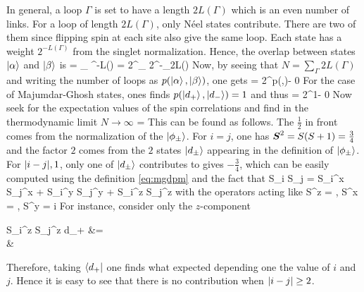 		In general, a loop $\Gamma$ is set to have a length $2L(\Gamma)$ which is an even number of links. For a loop of length $2L(\Gamma)$, only Néel states contribute. There are two of them since flipping spin at each site also give the same loop. Each state has a weight $2^{-L(\Gamma)}$ from the singlet normalization. Hence, the overlap between states $\ket \alpha$ and $\ket \beta$ is
		\be \braket{\alpha}{\beta} = \prod_ ^{-L(\Gamma)} = 2^{\sum_} 2^{-\sum_\Gamma 2L(\Gamma)} \ee
		Now, by seeing that $N = \sum_\Gamma 2L(\Gamma)$ and writing the number of loops as $p(\ket \alpha,\ket \beta)$, one gets
		\be \braket{\alpha}{\beta} = 2^{p(\ket \alpha,\ket \beta)-}  0 \ee
		For the case of Majumdar-Ghosh states, ones finds $p(\ket{d_+}, \ket{d_-}) = 1$ and thus
		\be {} = 2^{1-}  0 \ee
		Now seek for the expectation values of the spin correlations and find in the thermodynamic limit $N\to \infty$
		\be {} =   \ee
		This can be found as follows. The $\frac{1}{2}$ in front comes from the normalization of the $\ket{\phi_\pm}$. For $i=j$, one has $\vb* S^2 = S(S+1) = \frac{3}{4}$ and the factor $2$ comes from the $2$ states $\ket{d_\pm}$ appearing in the definition of $\ket{\phi_\pm}$. For ${\abs{i-j},1}$, only one of $\ket{d_\pm}$ contributes to gives $-\frac{3}{4}$, which can be easily computed using the definition \eqref{eq:mgdpm} and the fact that
		\be \vb* S_i \cdot \vb* S_j = S_i^x S_j^x + S_i^y S_j^y + S_i^z S_j^z \ee
		with the operators acting like
		\be S^z \ket \sigma = \sigma \ket \sigma, \quad S^x \ket \sigma = \abs{\sigma} \ket{-\sigma}, \quad S^y \ket \sigma = i\sigma \ket{-\sigma} \ee
		For instance, consider only the $z$-component
		\be \begin{split} S_i^z S_j^z \ket d_+ &= \cdots \otimes {}  \otimes \cdots  \\ &\otimes {}  \otimes \cdots \end{split} \ee
		Therefore, taking $\bra{d_+}$ one finds what expected depending one the value of $i$ and $j$. Hence it is easy to see that there is no contribution when $\abs{i-j} \geq 2$.

